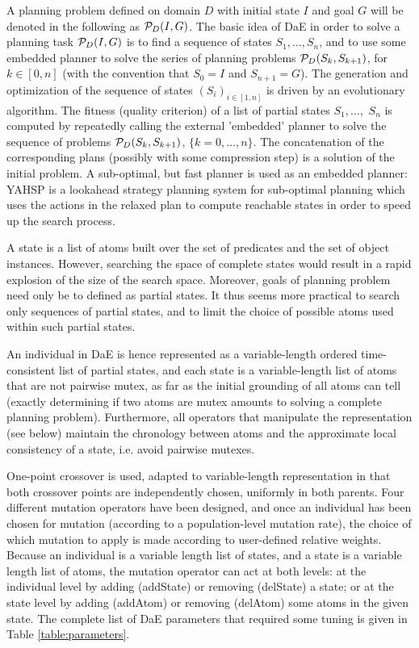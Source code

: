 \documentclass{article}
\begin{document}
A planning problem defined on domain $D$ with initial state $I$ and goal $G$ will be denoted in the following as ${\cal P}_D(I,G)$. The basic idea of DaE in order to solve a planning task ${\cal P}_D(I,G)$ is to find a sequence of states $S_1, \ldots, S_n$, and to use some embedded planner to solve the series of planning problems ${\cal P}_D(S_{k},S_{k+1})$, for $k \in [0,n]$ (with the convention that $S_0 = I$ and $S_{n+1} = G$). The generation and optimization of the sequence of states $(S_i)_{i \in [1,n]}$ is driven by an evolutionary algorithm. 
The fitness (quality criterion) of a list of partial states $S_1, \ldots,$ $S_n$ is computed by repeatedly calling the external 'embedded' planner to solve the sequence of problems ${\cal P}_D(S_{k},S_{k+1})$, $\{k=0,\ldots,n\}$. The concatenation of the corresponding plans (possibly with some compression step) is a solution of the initial problem.
A sub-optimal, but fast planner is used as an embedded planner: YAHSP \cite{V:icaps04} is a lookahead strategy planning system for sub-optimal planning which uses the  actions in the relaxed plan to compute reachable states in order to speed up the search process. 

A state is a list of atoms built over the set of predicates and the set of object instances. However, searching the space of complete states would result in a rapid explosion of the size of the search space. Moreover, goals of planning problem need only be to defined as partial states. It thus seems more practical to search only sequences of partial states, and to limit the choice of possible atoms used within such partial states. 

An individual in DaE is hence represented as a variable-length ordered time-consistent list of partial states, and each state is a variable-length list of atoms that are not pairwise mutex, as far as the initial grounding of all atoms  can tell (exactly determining if two atoms are mutex amounts to solving a complete planning problem). Furthermore, all operators that manipulate the representation (see below) maintain the chronology between atoms and the approximate local consistency of a state, i.e. avoid pairwise mutexes.

One-point crossover is used, adapted to variable-length representation in that both crossover points are independently chosen, uniformly in both parents.
Four different mutation operators have been designed, and once an individual has been chosen for mutation (according to a population-level mutation rate), the choice of which mutation to apply is made according to user-defined relative weights. 
Because an individual is a variable length list of states, and a state is a variable length list of atoms, the mutation 
operator can act at both levels: at the individual level by adding (addState) or removing (delState) 
a state; or at the state level by adding (addAtom) or removing (delAtom) some atoms in the given state. 
The complete list of DaE parameters that required some tuning is given in Table \ref{table:parameters}.
\end{document}
